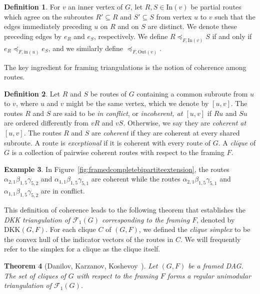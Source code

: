 \documentclass[12pt]{amsart}
\newtheorem{theorem}{Theorem}[section]
\theoremstyle{definition}
\newtheorem{definition}[theorem]{Definition}
\newtheorem{example}[theorem]{Example}
\newcommand\calF{\mathcal{F}}
\newcommand\inedge{\mathrm{in}}
\newcommand\In{\mathrm{In}}
\newcommand\Out{\mathrm{Out}}
\newcommand{\DKK}{\mathrm{DKK}}
\begin{document}
\begin{definition}
For $v$ an inner vertex of $G$, let $R, S \in \In(v)$ be partial routes which agree on the subroutes $R'\subseteq R$ and $S'\subseteq S$ from vertex $u$ to $v$ such that the edges immediately preceding $u$ on $R$ and on $S$ are distinct.
We denote these preceding edges by $e_R$ and $e_S$, respectively.
We define $R \preceq_{F,\In(v)} S$ if and only if $e_R \preceq_{F, \inedge(u)} e_S$, and we similarly define $\preceq_{F,\Out(v)}$.
\end{definition}

The key ingredient for framing triangulations is the notion of coherence among routes.

\begin{definition}
Let $R$ and $S$ be routes of $G$ containing a common subroute from $u$ to $v$, where $u$ and $v$ might be the same vertex, which we denote by $[u,v]$.
The routes $R$ and $S$ are said to be \emph{in conflict}, or \emph{incoherent, at $[u,v]$} if $Ru$ and $Su$ are ordered differently from $vR$ and $vS$.  
Otherwise, we say they are \emph{coherent at $[u,v]$}.
The routes $R$ and $S$ are \emph{coherent} if they are coherent at every shared subroute.
A route is \emph{exceptional} if it is coherent with every route of $G$.
A \emph{clique} of $G$ is a collection of pairwise coherent routes with respect to the framing $F$.    
\end{definition}

\begin{example}
    In Figure~\ref{fig:framedcompletebipartiteextension}, the routes $\alpha_{2,1}\beta_{1,5}\gamma_{5,2}$ and $\alpha_{1,1}\beta_{1,5}\gamma_{5,1}$ are coherent while the routes $\alpha_{2,1}\beta_{1,5}\gamma_{5,1}$ and $\alpha_{1,1}\beta_{1,5}\gamma_{5,2}$ are in conflict.
\end{example}

This definition of coherence leads to the following theorem that establishes the \emph{DKK triangulation of $\calF_1(G)$ corresponding to the framing $F$}, denoted by $\DKK(G,F)$.
For each clique $C$ of $(G,F)$, we defined the \emph{clique simplex} to be the convex hull of the indicator vectors of the routes in $C$.
We will frequently refer to the simplex for a clique as the clique itself.

\begin{theorem}[{Danilov, Karzanov, Koshevoy~\cite{DKK12}}]\label{thm:dkk-triangulation}
Let $(G,F)$ be a framed DAG.
The set of cliques of $G$ with respect to the framing $F$ forms a regular unimodular triangulation of $\calF_1(G)$.
\end{theorem}
\end{document}
